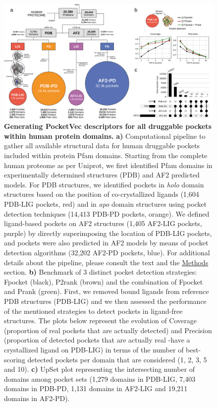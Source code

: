 \begin{figure}[H]
  \centering
  \includegraphics[width=\linewidth]{figures/PocketVec/Main/Fig2.png} 
  \caption{
    \textbf{Generating PocketVec descriptors for all druggable pockets within human protein domains.} 
    \textbf{a)} Computational pipeline to gather all available structural data for human druggable pockets included within protein Pfam domains. Starting from the complete human proteome as per Uniprot, we first identified Pfam domains in experimentally determined structures (PDB) and AF2 predicted models. For PDB structures, we identified pockets in \textit{holo} domain structures based on the position of co-crystallized ligands (1,604 PDB-LIG pockets, red) and in \textit{apo} domain structures using pocket detection techniques (14,413 PDB-PD pockets, orange). We defined ligand-based pockets on AF2 structures (1,405 AF2-LIG pockets, purple) by directly superimposing the location of PDB-LIG pockets, and pockets were also predicted in AF2 models by means of pocket detection algorithms (32,202 AF2-PD pockets, blue).  For additional details about the pipeline, please consult the text and the \hyperref[PocketVec_Methods]{Methods} section.
    \textbf{b)} Benchmark of 3 distinct pocket detection strategies: Fpocket (black), P2rank (brown) and the combination of Fpocket and Prank (green). First, we removed bound ligands from reference PDB structures (PDB-LIG) and we then assessed the performance of the mentioned strategies to detect pockets in ligand-free structures. The plots below represent the evolution of Coverage (proportion of real pockets that are actually detected) and Precision (proportion of detected pockets that are actually real -have a crystallized ligand on PDB-LIG) in terms of the number of best-scoring detected pockets per domain that are considered (1, 2, 3, 5 and 10).
    \textbf{c)} UpSet plot representing the intersecting number of domains among pocket sets (1,279 domains in PDB-LIG, 7,403 domains in PDB-PD, 1,131 domains in AF2-LIG and 19,211 domains in AF2-PD).
  }
  \label{PocketVec_Fig2}
\end{figure}



